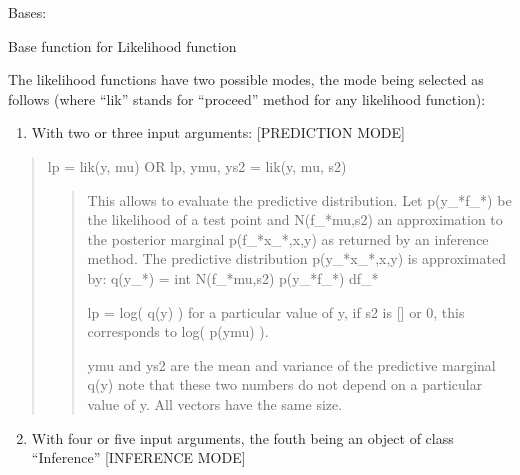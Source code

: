 \documentclass[letterpaper,10pt,english]{sphinxmanual}
\begin{document}
\begin{fulllineitems}
\label{pyGPs.Core:pyGPs.Core.lik.Likelihood}
Bases: 

Base function for Likelihood function

\begin{fulllineitems}
\label{pyGPs.Core:pyGPs.Core.lik.Likelihood.proceed}
The likelihood functions have two possible modes, the mode being selected
as follows (where ``lik'' stands for ``proceed'' method for any likelihood function):
\begin{enumerate}
\item {} 
With two or three input arguments:                       {[}PREDICTION MODE{]}

\end{enumerate}
\begin{quote}

lp = lik(y, mu) OR lp, ymu, ys2 = lik(y, mu, s2)
\begin{quote}

This allows to evaluate the predictive distribution. Let p(y\_*\textbar{}f\_*) be the
likelihood of a test point and N(f\_*\textbar{}mu,s2) an approximation to the posterior
marginal p(f\_*\textbar{}x\_*,x,y) as returned by an inference method. The predictive
distribution p(y\_*\textbar{}x\_*,x,y) is approximated by:
q(y\_*) = int N(f\_*\textbar{}mu,s2) p(y\_*\textbar{}f\_*) df\_*

lp = log( q(y) ) for a particular value of y, if s2 is {[}{]} or 0, this
corresponds to log( p(y\textbar{}mu) ).

ymu and ys2 are the mean and variance of the predictive marginal q(y)
note that these two numbers do not depend on a particular 
value of y.
All vectors have the same size.
\end{quote}
\end{quote}
\begin{enumerate}
\setcounter{enumi}{1}
\item {} 
With four or five input arguments, the fouth being an object of class ``Inference'' {[}INFERENCE MODE{]}

\end{enumerate}
\begin{quote}


\end{quote}
\end{fulllineitems}
\end{fulllineitems}
\end{document}
